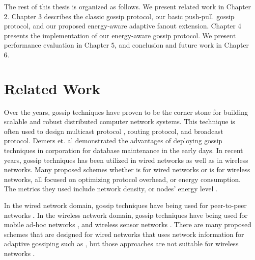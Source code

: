 \documentclass[onehalf,11pt]{beavtex}
\newcommand{\gp}{gossip protocol}
\newcommand{\pp}{push-pull}
\begin{document}
The rest of this thesis is organized as follows. We present related work in Chapter 2. Chapter 3 describes the classic \gp, our basic \pp ~\gp, and our proposed energy-aware adaptive fanout extension. Chapter 4 presents the implementation of our energy-aware \gp. We present performance evaluation in Chapter 5, and conclusion and future work in Chapter 6.





\chapter{Related Work} \label{Chapter2}

Over the years, gossip techniques have proven to be the corner stone for building scalable and robust distributed computer network systems. This technique is often used to design multicast protocol \cite{gupta2002efficient} \cite{gossip} , routing protocol, and broadcast protocol. Demers et. al \cite{demers1987epidemic} demonstrated the advantages of deploying gossip techniques in corporation for database maintenance in the early days. In recent years, gossip techniques has been utilized in wired networks \cite{birman1999bimodal} as well as in wireless networks. Many proposed schemes whether is for wired networks or is for wireless networks, all focused on optimizing protocol overhead, or energy consumption. The metrics they used include network density, or nodes' energy level \cite{} \cite{}. 

In the wired network domain, gossip techniques have being used for peer-to-peer networks \cite{gupta2002efficient}. In the wireless network domain, gossip techniques have being used for mobile ad-hoc networks \cite{chandra2001anonymous} \cite{vahdat2000epidemic}, and wireless sensor networks \cite{levis2004trickle} \cite{miller2005exploring}. There are many proposed schemes that are designed for wired networks that uses network information for adaptive gossiping such as \cite{kempe2004spatial} \cite{rodrigues2003adaptive}, but those approaches are not suitable for wireless networks \cite{smart}. 
\end{document}
